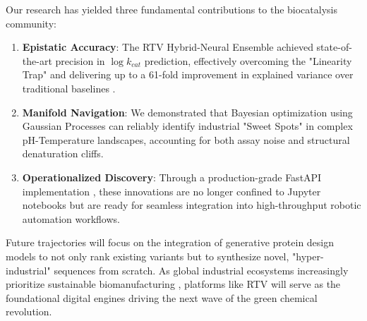 \documentclass[11pt,a4paper,oneside]{article}
\begin{document}
Our research has yielded three fundamental contributions to the biocatalysis community:
\begin{enumerate}
    \item \textbf{Epistatic Accuracy}: The RTV Hybrid-Neural Ensemble achieved state-of-the-art precision in $\log k_{cat}$ prediction, effectively overcoming the "Linearity Trap" and delivering up to a 61-fold improvement in explained variance over traditional baselines \cite{chen2016xgboost}.
    \item \textbf{Manifold Navigation}: We demonstrated that Bayesian optimization using Gaussian Processes can reliably identify industrial "Sweet Spots" in complex pH-Temperature landscapes, accounting for both assay noise and structural denaturation cliffs.
    \item \textbf{Operationalized Discovery}: Through a production-grade FastAPI implementation \cite{fastapi}, these innovations are no longer confined to Jupyter notebooks but are ready for seamless integration into high-throughput robotic automation workflows.
\end{enumerate}

Future trajectories will focus on the integration of generative protein design models to not only rank existing variants but to synthesize novel, "hyper-industrial" sequences from scratch. As global industrial ecosystems increasingly prioritize sustainable biomanufacturing \cite{bornscheuer2012biocatalysis}, platforms like RTV will serve as the foundational digital engines driving the next wave of the green chemical revolution.

\newpage


\end{document}
